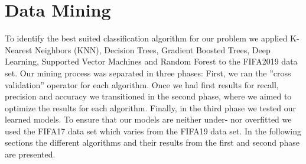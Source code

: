 \documentclass[runningheads]{llncs}
\begin{document}
\section{Data Mining}
\label{sec:DM}
To identify the best suited classification algorithm for our problem we applied K-Nearest Neighbors (KNN), Decision Trees, Gradient Boosted Trees, Deep Learning, Supported Vector Machines and Random Forest to the FIFA2019 data set.
Our mining process was separated in three phases: First, we ran the ''cross validation'' operator for each algorithm. Once we had first results for recall, precision and accuracy we transitioned in the second phase, where we aimed to optimize the results for each algorithm. Finally, in the third phase we tested our learned models. To ensure that our models are neither under- nor overfitted we used the FIFA17 data set which varies from the FIFA19 data set.
In the following sections the different algorithms and their results from the first and second phase are presented.












\newpage
%
%
\end{document}
